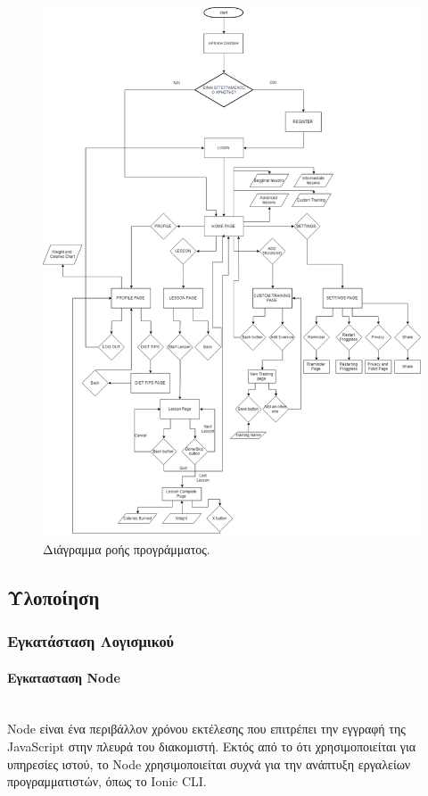 \documentclass[a4paper,12pt]{article}
\newcommand{\myparagraph}[1]{\paragraph{#1}\mbox{}\\}
\begin{document}
		\newpage
		\begin{figure}[!htb]
			\caption{Διάγραμμα ροής προγράμματος.}
			\vspace*{0.5cm}
			\centering
			\includegraphics[width=0.9\linewidth]{a1}
		\end{figure}

		\subsection{Υλοποίηση}
			\subsubsection{Εγκατάσταση Λογισμικού}

				\myparagraph{Eγκατασταση Node}
				Node είναι ένα περιβάλλον χρόνου εκτέλεσης που επιτρέπει την εγγραφή της JavaScript
				στην πλευρά του διακομιστή. Εκτός από το ότι χρησιμοποιείται για υπηρεσίες ιστού, 
				το Node χρησιμοποιείται συχνά για την ανάπτυξη εργαλείων προγραμματιστών, 
				όπως το Ionic CLI.
\end{document}
